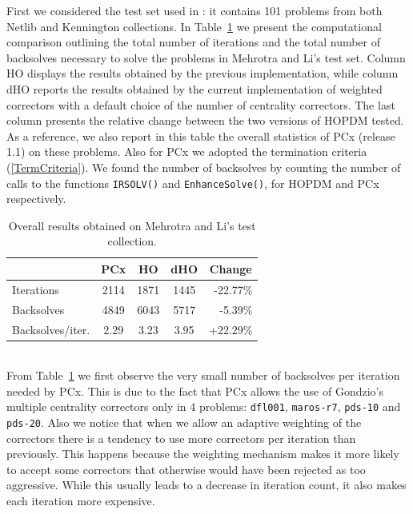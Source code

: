 First we considered the test set used in \cite{MehrotraLi}: 
it contains 101 problems from both Netlib and Kennington collections. 
%
In Table~\ref{MLtotals} we present the computational comparison 
outlining the total number of iterations and the total number 
of backsolves necessary to solve the problems in Mehrotra and Li's test set. 
Column HO displays the results obtained
by the previous implementation, while column dHO reports
the results obtained by the current implementation of weighted
correctors with a default choice of the number of centrality correctors. 
The last column presents the relative change between the two 
versions of HOPDM tested. 
As a reference, we also report in this table the overall
statistics of PCx (release 1.1) on these problems. Also for PCx we adopted
the termination criteria (\ref{TermCriteria}).
We found the number of backsolves by counting the number of calls 
to the functions {\tt IRSOLV()} and {\tt EnhanceSolve()}, for HOPDM and
PCx respectively.
%
\begin{table}[ht]
  \centering
  \begin{tabular}{|l|c||c|c|r|}\cline{2-5}
    \multicolumn{1}{c|}{}& PCx & HO & dHO &\multicolumn{1}{c|}{Change}\\ \hline
    Iterations       & 2114 & 1871  & 1445           &   -22.77\% \\ 
    Backsolves       & 4849 & 6043  & 5717           &   -5.39\%  \\
    Backsolves/iter. & 2.29 & 3.23  & 3.95           &   +22.29\% \\ \hline
  \end{tabular}
  \caption{Overall results obtained on Mehrotra and Li's test collection.}
  \label{MLtotals}
\end{table}
%
\\From Table~\ref{MLtotals} we first observe the very small number 
of backsolves per iteration needed by PCx. This is due to the fact 
that PCx allows the use of Gondzio's multiple centrality correctors 
only in 4 problems: {\tt dfl001}, {\tt maros-r7}, {\tt pds-10} and 
{\tt pds-20}.
%
Also we notice that when we allow an adaptive weighting 
of the correctors there is a tendency to use more correctors 
per iteration than previously. 
This happens because the weighting mechanism makes it more likely
to accept some correctors that otherwise would have been rejected
as too aggressive.
While this usually leads to a decrease 
in iteration count, it also makes each iteration more expensive.

